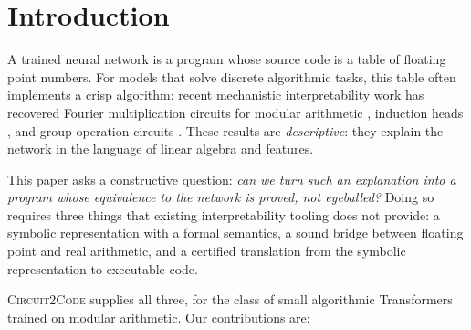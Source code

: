 \documentclass[11pt]{article}
\begin{document}
\section{Introduction}
\label{sec:intro}

A trained neural network is a program whose source code is a table of floating
point numbers. For models that solve discrete algorithmic tasks, this table
often implements a crisp algorithm: recent mechanistic interpretability work has
recovered Fourier multiplication circuits for modular arithmetic
\citep{nanda2023grokking}, induction heads \citep{olsson2022incontext}, and
group-operation circuits \citep{chughtai2023group}. These results are
\emph{descriptive}: they explain the network in the language of linear algebra
and features.

This paper asks a constructive question: \emph{can we turn such an explanation
into a program whose equivalence to the network is proved, not eyeballed?}
Doing so requires three things that existing interpretability tooling does not
provide: a symbolic representation with a formal semantics, a sound bridge
between floating point and real arithmetic, and a certified translation from the
symbolic representation to executable code.

\textsc{Circuit2Code} supplies all three, for the class of small algorithmic
Transformers trained on modular arithmetic. Our contributions are:
\end{document}
